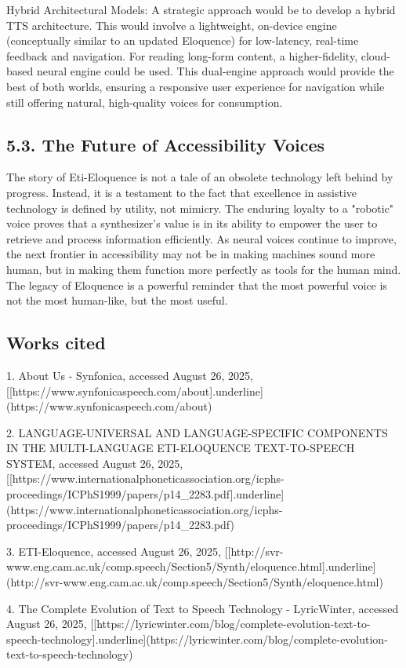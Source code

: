 Hybrid Architectural Models: A strategic approach would be to
develop a hybrid TTS architecture. This would involve a lightweight,
on-device engine (conceptually similar to an updated Eloquence) for
low-latency, real-time feedback and navigation. For reading long-form
content, a higher-fidelity, cloud-based neural engine could be used.
This dual-engine approach would provide the best of both worlds,
ensuring a responsive user experience for navigation while still
offering natural, high-quality voices for consumption.

\subsection{5.3. The Future of Accessibility Voices}
The story of Eti-Eloquence is not a tale of an obsolete technology left
behind by progress. Instead, it is a testament to the fact that
excellence in assistive technology is defined by utility, not mimicry.
The enduring loyalty to a "robotic" voice proves that a synthesizer's
value is in its ability to empower the user to retrieve and process
information efficiently. As neural voices continue to improve, the next
frontier in accessibility may not be in making machines sound more
human, but in making them function more perfectly as tools for the human
mind. The legacy of Eloquence is a powerful reminder that the most
powerful voice is not the most human-like, but the most useful.

\subsection{Works cited}
1.  About Us - Synfonica, accessed August 26, 2025,
    [[https://www.synfonicaspeech.com/about]{.underline}](https://www.synfonicaspeech.com/about)

2.  LANGUAGE-UNIVERSAL AND LANGUAGE-SPECIFIC COMPONENTS IN THE
    MULTI-LANGUAGE ETI-ELOQUENCE TEXT-TO-SPEECH SYSTEM, accessed August
    26, 2025,
    [[https://www.internationalphoneticassociation.org/icphs-proceedings/ICPhS1999/papers/p14_2283.pdf]{.underline}](https://www.internationalphoneticassociation.org/icphs-proceedings/ICPhS1999/papers/p14_2283.pdf)

3.  ETI-Eloquence, accessed August 26, 2025,
    [[http://svr-www.eng.cam.ac.uk/comp.speech/Section5/Synth/eloquence.html]{.underline}](http://svr-www.eng.cam.ac.uk/comp.speech/Section5/Synth/eloquence.html)

4.  The Complete Evolution of Text to Speech Technology - LyricWinter,
    accessed August 26, 2025,
    [[https://lyricwinter.com/blog/complete-evolution-text-to-speech-technology]{.underline}](https://lyricwinter.com/blog/complete-evolution-text-to-speech-technology)

